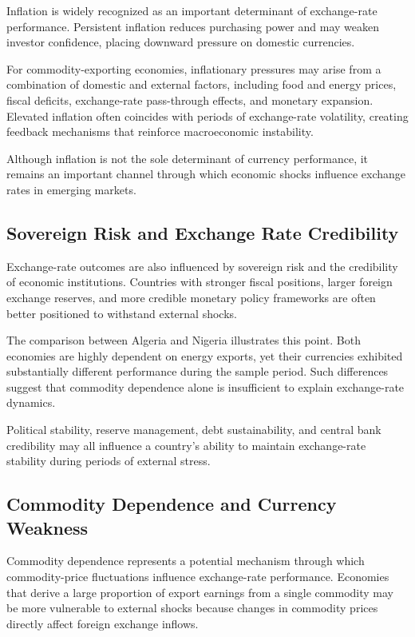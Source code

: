 \documentclass{article}
\begin{document}
Inflation is widely recognized as an important determinant of exchange-rate performance. Persistent inflation reduces purchasing power and may weaken investor confidence, placing downward pressure on domestic currencies.

For commodity-exporting economies, inflationary pressures may arise from a combination of domestic and external factors, including food and energy prices, fiscal deficits, exchange-rate pass-through effects, and monetary expansion. Elevated inflation often coincides with periods of exchange-rate volatility, creating feedback mechanisms that reinforce macroeconomic instability.

Although inflation is not the sole determinant of currency performance, it remains an important channel through which economic shocks influence exchange rates in emerging markets.

\subsection{Sovereign Risk and Exchange Rate Credibility}

Exchange-rate outcomes are also influenced by sovereign risk and the credibility of economic institutions. Countries with stronger fiscal positions, larger foreign exchange reserves, and more credible monetary policy frameworks are often better positioned to withstand external shocks.

The comparison between Algeria and Nigeria illustrates this point. Both economies are highly dependent on energy exports, yet their currencies exhibited substantially different performance during the sample period. Such differences suggest that commodity dependence alone is insufficient to explain exchange-rate dynamics.

Political stability, reserve management, debt sustainability, and central bank credibility may all influence a country's ability to maintain exchange-rate stability during periods of external stress.

\subsection{Commodity Dependence and Currency Weakness}

Commodity dependence represents a potential mechanism through which commodity-price fluctuations influence exchange-rate performance. Economies that derive a large proportion of export earnings from a single commodity may be more vulnerable to external shocks because changes in commodity prices directly affect foreign exchange inflows.
\end{document}
